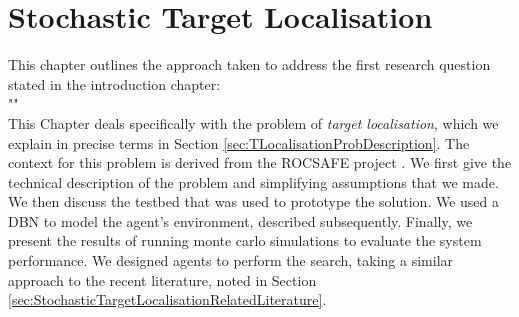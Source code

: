 
\chapter{Stochastic Target Localisation}\label{chap:targetLocalisation}
This chapter outlines the approach taken to address the first research question stated in the introduction chapter:
\\
"\textit{}"
\\
This Chapter deals specifically with the problem of \textit{target localisation}, which we explain in precise terms in Section \ref{sec:TLocalisationProbDescription}. The context for this problem is derived from the ROCSAFE project \cite{Bagherzadeh2017ROCSAFE:Incidents}. We first give the technical description of the problem and simplifying assumptions that we made. We then discuss the testbed that was used to prototype the solution. We used a DBN to model the agent's environment, described subsequently. Finally, we present the results of running monte carlo simulations to evaluate the system performance. We designed agents to perform the search, taking a similar approach to the recent literature, noted in Section \ref{sec:StochasticTargetLocalisationRelatedLiterature}.











\label{sec:SimulationResults}

